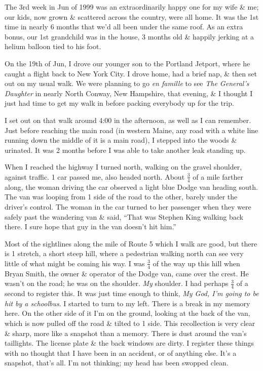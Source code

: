 \documentclass{article}
\numberwithin{equation}{section}
\begin{document}
The 3rd week in Jun of 1999 was an extraordinarily happy one for my wife \& me; our kids, now grown \& scattered across the country, were all home. It was the 1st time in nearly 6 months that we'd all been under the same roof. As an extra bonus, our 1st grandchild was in the house, 3 months old \& happily jerking at a helium balloon tied to his foot.

On the 19th of Jun, I drove our younger son to the Portland Jetport, where he caught a flight back to New York City. I drove home, had a brief nap, \& then set out on my usual walk. We were planning to go \textit{en famille} to see \textit{The General's Daughter} in nearly North Conway, New Hampshire, that evening, \& I thought I just had time to get my walk in before packing everybody up for the trip.

I set out on that walk around 4:00 in the afternoon, as well as I can remember. Just before reaching the main road (in western Maine, any road with a white line running down the middle of it is a main road), I stepped into the woods \& urinated. It was 2 months before I was able to take another leak standing up.

When I reached the highway I turned north, walking on the gravel shoulder, against traffic. 1 car passed me, also headed north. About $\frac{3}{4}$ of a mile farther along, the woman driving the car observed a light blue Dodge van heading south. The van was looping from 1 side of the road to the other, barely under the driver's control. The woman in the car turned to her passenger when they were safely past the wandering van \& said, ``That was Stephen King walking back there. I sure hope that guy in the van doesn't hit him.''

Most of the sightlines along the mile of Route 5 which I walk are good, but there is 1 stretch, a short steep hill, where a pedestrian walking north can see very little of what might be coming his way. I was $\frac{3}{4}$ of the way up this hill when Bryan Smith, the owner \& operator of the Dodge van, came over the crest. He wasn't on the road; he was on the shoulder. \textit{My} shoulder. I had perhaps $\frac{3}{4}$ of a second to register this. It was just time enough to think, \textit{My God, I'm going to be hit by a schoolbus}. I started to turn to my left. There is a break in my memory here. On the other side of it I'm on the ground, looking at the back of the van, which is now pulled off the road \& tilted to 1 side. This recollection is very clear \& sharp, more like a snapshot than a memory. There is dust around the van's taillights. The license plate \& the back windows are dirty. I register these things with no thought that I have been in an accident, or of anything else. It's a snapshot, that's all. I'm not thinking; my head has been swopped clean.
\end{document}
